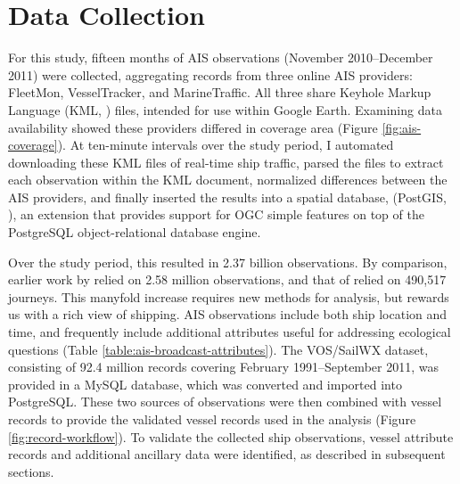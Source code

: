 \section{Data Collection}

For this study, fifteen months of AIS observations (November 2010--December 2011) were collected, aggregating records from three online AIS providers: FleetMon, VesselTracker, and MarineTraffic. All three share Keyhole Markup Language (KML, \citeauthor{KML}) files, intended for use within Google Earth. Examining data availability showed these providers differed in coverage area (Figure \ref{fig:ais-coverage}).  At ten-minute intervals over the study period, I automated downloading these KML files of real-time ship traffic, parsed the files to extract each observation within the KML document, normalized differences between the AIS providers, and finally inserted the results into a spatial database, (\textsf{PostGIS}, \citeauthor{ramsey2005postgis}), an extension that provides support for OGC simple features \citep{OGCSimple} on top of the \textsf{PostgreSQL} \citep{postgresql} object-relational database engine. 

Over the study period, this resulted in 2.37 billion observations. By comparison, earlier work by \cite{Halpern2008} relied on 2.58 million observations, and that of \cite{Kaluza2010} relied on 490,517 journeys. This manyfold increase requires new methods for analysis, but rewards us with a rich view of shipping. %
AIS observations include both ship location and time, and frequently include additional attributes useful for addressing ecological questions (Table \ref{table:ais-broadcast-attributes}).  The VOS/SailWX dataset, consisting of 92.4 million records covering February 1991--September 2011, was provided in a \textsf{MySQL} database, which was converted and imported into \textsf{PostgreSQL}. These two sources of observations were then combined with vessel records to provide the validated vessel records used in the analysis (Figure \ref{fig:record-workflow}). To validate the collected ship observations, vessel attribute records and additional ancillary data were identified, as described in subsequent sections.

